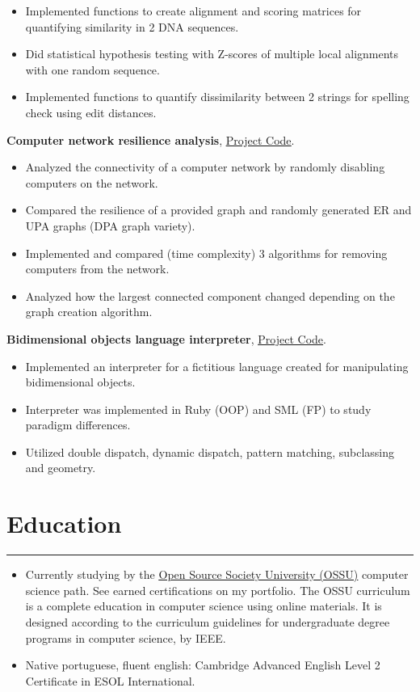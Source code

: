 \documentclass[a4paper,10pt]{article}
\newcommand{\ulink}[2]{\href{#1}{\underline{#2}}}
\begin{document}
\begin{itemize}[itemsep=0pt]
  \item Implemented functions to create alignment and scoring matrices for quantifying similarity in 2 DNA sequences.
  \item Did statistical hypothesis testing with Z-scores of multiple local alignments with one random sequence.
  \item Implemented functions to quantify dissimilarity between 2 strings for spelling check using edit distances.
\end{itemize}
\textbf{Computer network resilience analysis}, \ulink{https://github.com/rokobo/Computer-Network-Resilience-Analysis}{Project Code}.
\begin{itemize}[itemsep=0pt]
  \item Analyzed the connectivity of a computer network by randomly disabling computers on the network.
  \item Compared the resilience of a provided graph and randomly generated ER and UPA graphs (DPA graph variety).
  \item Implemented and compared (time complexity) 3 algorithms for removing computers from the network.
  \item Analyzed how the largest connected component changed depending on the graph creation algorithm.
\end{itemize}
\textbf{Bidimensional objects language interpreter}, \ulink{https://github.com/rokobo/2D-objects-language}{Project Code}.
\begin{itemize}[itemsep=0pt]
  \item Implemented an interpreter for a fictitious language created for manipulating bidimensional objects.
  \item Interpreter was implemented in Ruby (OOP) and SML (FP) to study paradigm differences.
  \item Utilized double dispatch, dynamic dispatch, pattern matching, subclassing and geometry.
\end{itemize}

\section*{Education}
\hrule
\vspace{2mm}
\begin{itemize}[itemsep=0pt]
  \item Currently studying by the
        \ulink{https://github.com/ossu/computer-science}{Open Source Society University (OSSU)}
        computer science path. See earned certifications on my portfolio. The OSSU curriculum
        is a complete education in computer science using online materials. It is designed
        according to the curriculum guidelines for undergraduate degree programs in computer science, by IEEE.

  \item Native portuguese, fluent english: Cambridge Advanced English Level 2
        Certificate in ESOL International.
\end{itemize}
\end{document}
